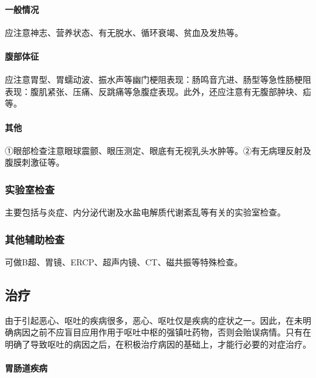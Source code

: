 \paragraph{一般情况}

应注意神志、营养状态、有无脱水、循环衰竭、贫血及发热等。

\paragraph{腹部体征}

应注意胃型、胃蠕动波、振水声等幽门梗阻表现：肠鸣音亢进、肠型等急性肠梗阻表现：腹肌紧张、压痛、反跳痛等急腹症表现。此外，还应注意有无腹部肿块、疝等。

\paragraph{其他}

①眼部检查注意眼球震颤、眼压测定、眼底有无视乳头水肿等。②有无病理反射及腹膜刺激征等。

\subsubsection{实验室检查}

主要包括与炎症、内分泌代谢及水盐电解质代谢紊乱等有关的实验室检查。

\subsubsection{其他辅助检查}

可做B超、胃镜、ERCP、超声内镜、CT、磁共振等特殊检查。

\subsection{治疗}

由于引起恶心、呕吐的疾病很多，恶心、呕吐仅是疾病的症状之一。因此，在未明确病因之前不应盲目应用作用于呕吐中枢的强镇吐药物，否则会贻误病情。只有在明确了导致呕吐的病因之后，在积极治疗病因的基础上，才能行必要的对症治疗。

\paragraph{胃肠道疾病}

